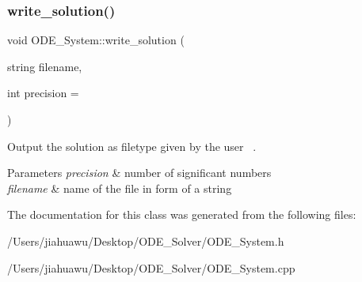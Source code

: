 \mbox{\label{class_o_d_e___system_ad07810b15fa1d891b64a83812433fef6}} 
\subsubsection{\texorpdfstring{write\+\_\+solution()}{write\_solution()}}
{\footnotesize\ttfamily void O\+D\+E\+\_\+\+System\+::write\+\_\+solution (\begin{DoxyParamCaption}\item[{string}]{filename,  }\item[{int}]{precision = {} }\end{DoxyParamCaption})}



Output the solution as filetype given by the user~\newline
. 


\begin{DoxyParams}{Parameters}
{\em precision} & number of significant numbers~\newline
\\
\hline
{\em filename} & name of the file in form of a string \\
\hline
\end{DoxyParams}


The documentation for this class was generated from the following files\+:\begin{DoxyCompactItemize}
\item 
/\+Users/jiahuawu/\+Desktop/\+O\+D\+E\+\_\+\+Solver/O\+D\+E\+\_\+\+System.\+h\item 
/\+Users/jiahuawu/\+Desktop/\+O\+D\+E\+\_\+\+Solver/O\+D\+E\+\_\+\+System.\+cpp\end{DoxyCompactItemize}
